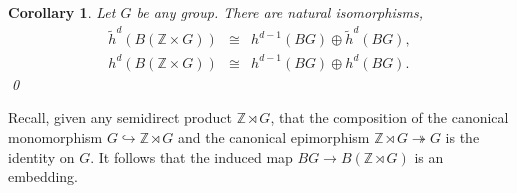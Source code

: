 \documentclass[sort&compress]{elsarticle}
\theoremstyle{theoremstyle}
\newtheorem{cor}[nul]{Corollary}
\theoremstyle{framedtheoremstyle}
\theoremstyle{definitionstyle}
\theoremstyle{definitionstyle}
\theoremstyle{definitionstyle}
\theoremstyle{definitionstyle}
\theoremstyle{nameddefinitionstyle}
\theoremstyle{framednameddefinitionstyle}
\theoremstyle{proofstyle}
\newtheorem{pf}{Proof}
\theoremstyle{definitionstyle}
\newcommand{\fromto}{\rightarrow}
\newcommand{\oneone}{\hookrightarrow}
\newcommand{\onto}{\twoheadrightarrow}
\newcommand{\ZZZ}{\mathbb{Z}}
\renewcommand{\SS}{\mathbf{S}}
\DeclareMathOperator{\identity}{id}
\newcommand{\isomorphic}{\cong}
\newcommand{\paren}[1]{\left( #1 \right)}
\DeclareMathOperator{\pt}{pt}
\begin{document}
\begin{appendices}


\begin{cor}
Let $G$ be any group. There are natural isomorphisms,
\begin{eqnarray}
\tilde h^d\paren{ B(\ZZZ\times G) } &\isomorphic& h^{d-1}\paren{BG} \oplus \tilde h^d\paren{BG}, \label{generalized_Kunneth_formula_isomorphism} \\
h^d\paren{ B(\ZZZ\times G) } &\isomorphic& h^{d-1}\paren{BG} \oplus h^d\paren{BG}. \label{generalized_Kunneth_formula_isomorphism_2}
\end{eqnarray}\qed\label{cor:generalized_Kunneth_formula}
\end{cor}







Recall, given any semidirect product $\ZZZ \rtimes G$, that the composition of the canonical monomorphism $G \oneone \ZZZ \rtimes G$ and the canonical epimorphism $\ZZZ \rtimes G \onto G$ is the identity on $G$. It follows that the induced map $BG \fromto B\paren{\ZZZ \rtimes G}$ is an embedding.


\end{appendices}
\end{document}
